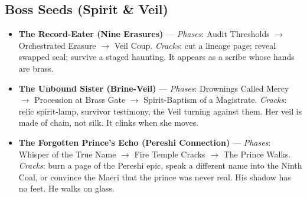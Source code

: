\subsection*{Boss Seeds (Spirit \& Veil)}
\label{sec:ashaan-bosses}

\begin{itemize}
\item \textbf{The Record-Eater (Nine Erasures)} --- \emph{Phases}: Audit Thresholds \(\rightarrow\) Orchestrated Erasure \(\rightarrow\) Veil Coup. \emph{Cracks}: cut a lineage page; reveal swapped seal; survive a staged haunting. It appears as a scribe whose hands are brass.
\item \textbf{The Unbound Sister (Brine-Veil)} --- \emph{Phases}: Drownings Called Mercy \(\rightarrow\) Procession at Brass Gate \(\rightarrow\) Spirit-Baptism of a Magistrate. \emph{Cracks}: relic spirit-lamp, survivor testimony, the Veil turning against them. Her veil is made of chain, not silk. It clinks when she moves.
\item \textbf{The Forgotten Prince's Echo (Pereshi Connection)} --- \emph{Phases}: Whisper of the True Name \(\rightarrow\) Fire Temple Cracks \(\rightarrow\) The Prince Walks. \emph{Cracks}: burn a page of the Pereshi epic, speak a different name into the Ninth Coal, or convince the Maeri that the prince was never real. His shadow has no feet. He walks on glass.
\end{itemize}

